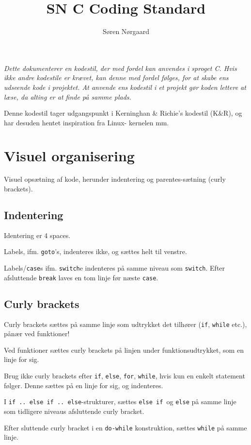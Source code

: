 \documentclass[article]{memoir}
\title{SN C Coding Standard}
\author{Søren Nørgaard}
\let\tempone\itemize
\let\temptwo\enditemize
\renewenvironment{itemize}{\tempone\firmlist}{\temptwo}
\begin{document}
\maketitle

{
    \itshape
    Dette dokumenterer en kodestil, der med fordel kan anvendes i sproget C. Hvis ikke andre kodestile er krævet, kan denne med fordel følges, for at skabe ens udseende kode i projektet. At anvende ens kodestil i et projekt gør koden lettere at læse, da alting er at finde på samme plads.

    Denne kodestil tager udgangspunkt i Kerninghan \& Richie's kodestil (K\&R), og har desuden hentet inspiration fra Linux- kernelen mm.
}

\chapter{Visuel organisering}
Visuel opsætning af kode, herunder indentering og parentes-sætning (curly brackets).

\section{Indentering}
\begin{itemize}
    \item Identering er 4 spaces.
    \item Labels, ifm. \texttt{goto}'s, indenteres ikke, og sættes helt til venstre.
    \item Labels/\texttt{case}s ifm. \texttt{switch}e indenteres på samme niveau som \texttt{switch}. Efter afsluttende \texttt{break} laves en tom linje før næste \texttt{case}.
\end{itemize}

\section{Curly brackets}
\begin{itemize}
    \item Curly brackets sættes på samme linje som udtrykket det tilhører (\texttt{if}, \texttt{while} etc.), pånær ved funktioner!
    \item Ved funktioner sættes curly brackets på linjen under funktionsudtrykket, som en linje for sig.
    \item Brug ikke curly brackets efter \texttt{if}, \texttt{else}, \texttt{for}, \texttt{while}, hvis kun en enkelt statement følger. Denne sættes på en linje for sig, og indenteres.
    \item I \texttt{if .. else if .. else}-strukturer, sættes \texttt{else if }og \texttt{else} på samme linje som tidligere niveaus afsluttende curly bracket.
    \item Efter sluttende curly bracket i en \texttt{do-while} konstruktion, sættes \texttt{while} på samme linje.
\end{itemize}
\end{document}
